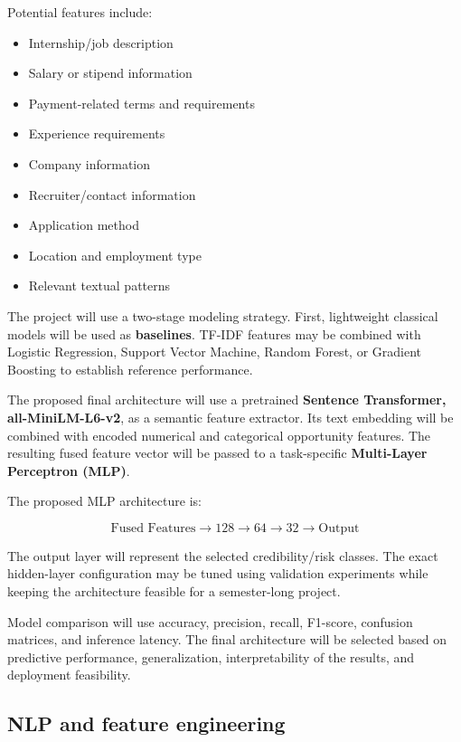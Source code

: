 \documentclass[11pt,a4paper]{article}
\newcommand{\BvrHint}[1]{%
  {\normalfont\normalsize\itshape\hfill #1}}
\begin{document}
Potential features include:
\begin{itemize}[leftmargin=0.7cm]

    \item Internship/job description
    \item Salary or stipend information
    \item Payment-related terms and requirements
    \item Experience requirements
    \item Company information
    \item Recruiter/contact information
    \item Application method
    \item Location and employment type
    \item Relevant textual patterns
\end{itemize}

The project will use a two-stage modeling strategy. First, lightweight
classical models will be used as \textbf{baselines}. TF-IDF features may be
combined with Logistic Regression, Support Vector Machine, Random Forest,
or Gradient Boosting to establish reference performance.

The proposed final architecture will use a pretrained
\textbf{Sentence Transformer, all-MiniLM-L6-v2}, as a semantic feature
extractor. Its text embedding will be combined with encoded numerical and
categorical opportunity features. The resulting fused feature vector will
be passed to a task-specific \textbf{Multi-Layer Perceptron (MLP)}.

The proposed MLP architecture is:

\[
\text{Fused Features}
\rightarrow
128
\rightarrow
64
\rightarrow
32
\rightarrow
\text{Output}
\]

The output layer will represent the selected credibility/risk classes.
The exact hidden-layer configuration may be tuned using validation
experiments while keeping the architecture feasible for a semester-long
project.

Model comparison will use accuracy, precision, recall, F1-score, confusion
matrices, and inference latency. The final architecture will be selected
based on predictive performance, generalization, interpretability of the
results, and deployment feasibility.

\subsection{NLP and feature engineering%
\BvrHint{}}
\end{document}
